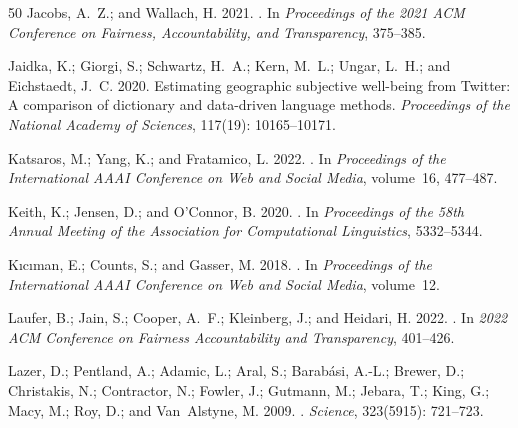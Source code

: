 \begin{thebibliography}{50}
Jacobs, A.~Z.; and Wallach, H. 2021.
.
\newblock In \emph{Proceedings of the 2021 ACM Conference on Fairness, Accountability, and Transparency}, 375--385.

Jaidka, K.; Giorgi, S.; Schwartz, H.~A.; Kern, M.~L.; Ungar, L.~H.; and Eichstaedt, J.~C. 2020.
\newblock Estimating geographic subjective well-being from Twitter: A comparison of dictionary and data-driven language methods.
\newblock \emph{Proceedings of the National Academy of Sciences}, 117(19): 10165--10171.

Katsaros, M.; Yang, K.; and Fratamico, L. 2022.
.
\newblock In \emph{Proceedings of the International AAAI Conference on Web and Social Media}, volume~16, 477--487.

Keith, K.; Jensen, D.; and O'Connor, B. 2020.
.
\newblock In \emph{Proceedings of the 58th Annual Meeting of the Association for Computational Linguistics}, 5332--5344.

K{\i}c{\i}man, E.; Counts, S.; and Gasser, M. 2018.
.
\newblock In \emph{Proceedings of the International AAAI Conference on Web and Social Media}, volume~12.

Laufer, B.; Jain, S.; Cooper, A.~F.; Kleinberg, J.; and Heidari, H. 2022.
.
\newblock In \emph{2022 ACM Conference on Fairness Accountability and Transparency}, 401--426.

Lazer, D.; Pentland, A.; Adamic, L.; Aral, S.; Barab{\'{a}}si, A.-L.; Brewer, D.; Christakis, N.; Contractor, N.; Fowler, J.; Gutmann, M.; Jebara, T.; King, G.; Macy, M.; Roy, D.; and Van~Alstyne, M. 2009.
.
\newblock \emph{Science}, 323(5915): 721--723.


\end{thebibliography}
